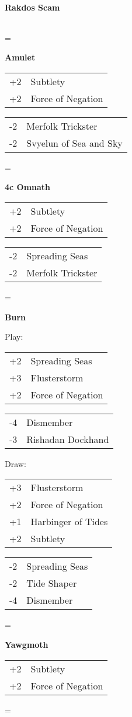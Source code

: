 \documentclass[fontsize=12pt,paper=a4]{scrartcl}
\newenvironment{absolutelynopagebreak}
  {\par\nobreak\vfil\penalty0\vfilneg
   \vtop\bgroup}
  {\par\xdef\tpd{\the\prevdepth}\egroup
   \prevdepth=\tpd}
\newenvironment{decklist}{%
    \begin{tabular}{>{\hspace{-4pt}}r<{\hspace{-3pt}}>{\hspace{-3pt}}l<{\hspace{-4pt}}}
    }{%
    \end{tabular}
    \par
}
\newcommand{\card}[2]{#1 & #2\\}
\newenvironment{sideboardguide}{%
    \newpage
    \begin{multicols}{4}
        \begin{small}
        }{%
        \end{small}
    \end{multicols}
}
\newenvironment{matchup}[1]{%
    \begin{absolutelynopagebreak}
        \textbf{#1}\par
    }{%
    \end{absolutelynopagebreak}
    \par\vspace{2em}
}
\begin{document}
\begin{sideboardguide}
\begin{matchup}{Rakdos Scam}
\begin{decklist}
        \end{decklist}
    \end{matchup}
    \begin{matchup}{Amulet}
        \begin{decklist}
            \card{+2}{Subtlety}
            \card{+2}{Force of Negation}
        \end{decklist}
        \begin{decklist}
            \card{-2}{Merfolk Trickster}
            \card{-2}{Svyelun of Sea and Sky}
        \end{decklist}
    \end{matchup}
    \begin{matchup}{4c Omnath}
        \begin{decklist}
            \card{+2}{Subtlety}
            \card{+2}{Force of Negation}
        \end{decklist}
        \begin{decklist}
            \card{-2}{Spreading Seas}
            \card{-2}{Merfolk Trickster}
        \end{decklist}
    \end{matchup}
    \begin{matchup}{Burn}
        Play:\par
        \begin{decklist}
            \card{+2}{Spreading Seas}
            \card{+3}{Flusterstorm}
            \card{+2}{Force of Negation}
        \end{decklist}
        \begin{decklist}
            \card{-4}{Dismember}
            \card{-3}{Rishadan Dockhand}
        \end{decklist}
        Draw:\par
        \begin{decklist}
            \card{+3}{Flusterstorm}
            \card{+2}{Force of Negation}
            \card{+1}{Harbinger of Tides}
            \card{+2}{Subtlety}
        \end{decklist}
        \begin{decklist}
            \card{-2}{Spreading Seas}
            \card{-2}{Tide Shaper}
            \card{-4}{Dismember}
        \end{decklist}
    \end{matchup}
    \begin{matchup}{Yawgmoth}
        \begin{decklist}
            \card{+2}{Subtlety}
            \card{+2}{Force of Negation}

\end{decklist}
\end{matchup}
\end{sideboardguide}
\end{document}
